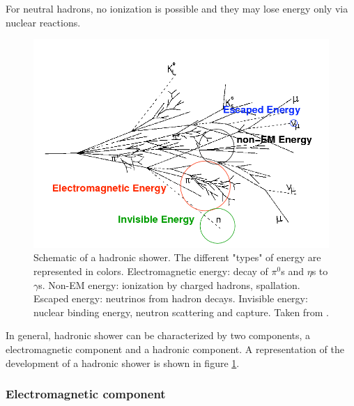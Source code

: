 For neutral hadrons, no ionization is possible and they may lose energy only via nuclear reactions.
\begin{figure}[htbp!]
  \centering
  \includegraphics[width=0.7\linewidth]{chap2/fig/images_had-shower.png}
  \caption{Schematic of a hadronic shower. The different "types" of energy are represented in colors. Electromagnetic energy: decay of $\pi^0$s and $\eta$s to $\gamma$s. Non-EM energy: ionization by charged hadrons, spallation. Escaped energy: neutrinos from hadron decays. Invisible energy: nuclear binding energy, neutron scattering and capture. Taken from \cite{Grahn:2009ki}.} \label{fig:HadShower}
\end{figure}

In general, hadronic shower can be characterized by two components, a electromagnetic component and a hadronic component. A representation of the development of a hadronic shower is shown in figure \ref{fig:HadShower}.

\subsubsection{Electromagnetic component}

